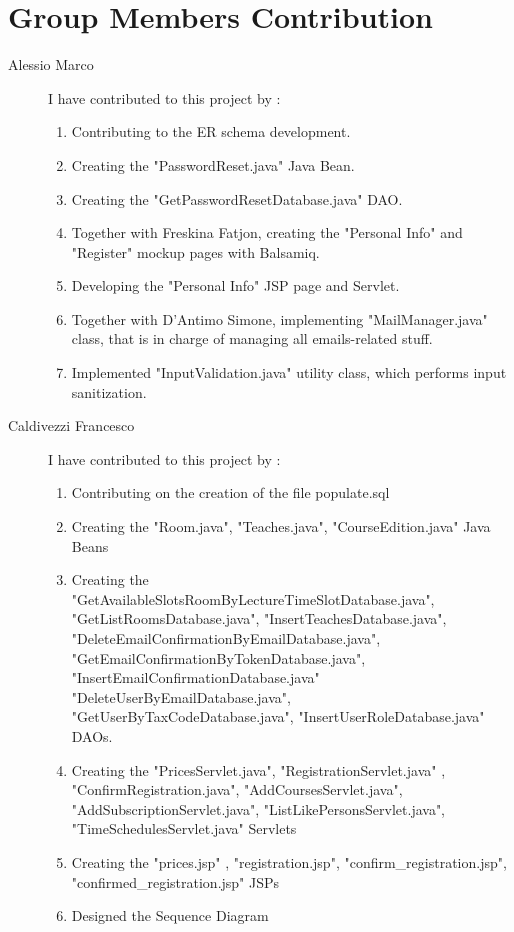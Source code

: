 \section{Group Members Contribution}


\begin{description}
	\item[Alessio Marco] I have contributed to this project by :
	\begin{enumerate}
		\item Contributing to the ER schema development.
		\item Creating the "PasswordReset.java" Java Bean.
		\item Creating the "GetPasswordResetDatabase.java" DAO.
		\item Together with Freskina Fatjon, creating the "Personal Info" and "Register" mockup pages with Balsamiq.
		\item Developing the "Personal Info" JSP page and Servlet.
		\item Together with D'Antimo Simone, implementing "MailManager.java" class, that is in charge of managing all emails-related stuff.
		\item Implemented "InputValidation.java" utility class, which performs input sanitization.
	\end{enumerate}
	\item[Caldivezzi Francesco] I have contributed to this project by :
	
		\begin{enumerate}
		\item Contributing on the creation of the file populate.sql
		\item Creating the "Room.java", "Teaches.java", "CourseEdition.java" Java Beans
		\item Creating the "GetAvailableSlotsRoomByLectureTimeSlotDatabase.java", "GetListRoomsDatabase.java", "InsertTeachesDatabase.java", 	"DeleteEmailConfirmationByEmailDatabase.java", "GetEmailConfirmationByTokenDatabase.java", "InsertEmailConfirmationDatabase.java" "DeleteUserByEmailDatabase.java", "GetUserByTaxCodeDatabase.java", "InsertUserRoleDatabase.java" DAOs.
		\item Creating the "PricesServlet.java", "RegistrationServlet.java" , "ConfirmRegistration.java", "AddCoursesServlet.java", "AddSubscriptionServlet.java", "ListLikePersonsServlet.java", "TimeSchedulesServlet.java" Servlets
		\item Creating the "prices.jsp" , "registration.jsp", "confirm\_registration.jsp", "confirmed\_registration.jsp" JSPs	
		\item Designed the Sequence Diagram			
		\end{enumerate}


\end{description}
